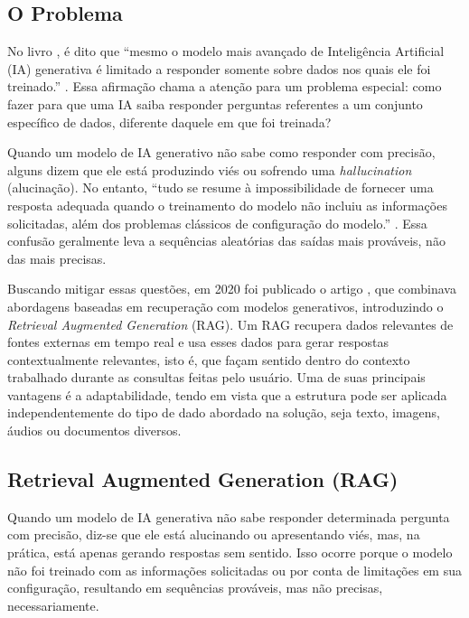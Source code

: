 \documentclass[a4paper, 12pt]{article}
\newcommand{\citeb}[1]{\bibleftbracket\cite{#1}\bibrightbracket}
\begin{document}
    
    \subsection{O Problema}

    No livro , é dito que ``mesmo o modelo mais avançado de Inteligência Artificial (IA) generativa é limitado a responder somente sobre dados nos quais ele foi treinado.'' \citeb{rothman}. Essa afirmação chama a atenção para um problema especial: como fazer para que uma IA saiba responder perguntas referentes a um conjunto específico de dados, diferente daquele em que foi treinada?

    Quando um modelo de IA generativo não sabe como responder com precisão, alguns dizem que ele está produzindo viés ou sofrendo uma \textit{hallucination} (alucinação). No entanto, ``tudo se resume à impossibilidade de fornecer uma resposta adequada quando o treinamento do modelo não incluiu as informações solicitadas, além dos problemas clássicos de configuração do modelo.'' \citeb{rothman}. Essa confusão geralmente leva a sequências aleatórias das saídas mais prováveis, não das mais precisas.

    Buscando mitigar essas questões, em 2020 foi publicado o artigo  \citeb{RAG}, que combinava abordagens baseadas em recuperação com modelos generativos, introduzindo o \textit{Retrieval Augmented Generation} (RAG). Um RAG recupera dados relevantes de fontes externas em tempo real e usa esses dados para gerar respostas contextualmente relevantes, isto é, que façam sentido dentro do contexto trabalhado durante as consultas feitas pelo usuário. Uma de suas principais vantagens é a adaptabilidade, tendo em vista que a estrutura pode ser aplicada independentemente do tipo de dado abordado na solução, seja texto, imagens, áudios ou documentos diversos.


    \subsection{Retrieval Augmented Generation (RAG)}
    
    Quando um modelo de IA generativa não sabe responder determinada pergunta com precisão, diz-se que ele está alucinando ou apresentando viés, mas, na prática, está apenas gerando respostas sem sentido. Isso ocorre porque o modelo não foi treinado com as informações solicitadas ou por conta de limitações em sua configuração, resultando em sequências prováveis, mas não precisas, necessariamente.
\end{document}
